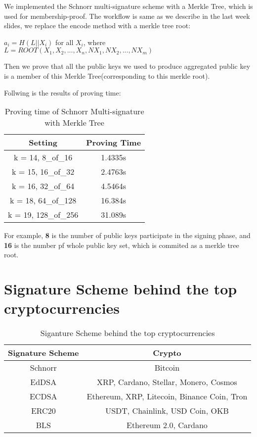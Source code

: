 \documentclass{article}
\begin{document}
We implemented the Schnorr multi-signature scheme with a Merkle Tree, which is used for membership-proof.
The workflow is same as we describe in the last week slides, we replace the encode method with a merkle tree root:

$a_i = H(L || X_i)$ for all $X_i$, where $L = ROOT(X_1, X_2, ... , X_n, NX_1, NX_2, ... , NX_m)$

Then we prove that all the public keys we used to produce aggregated public key is a member of this Merkle Tree(corresponding to this merkle root).

Follwing is the results of proving time:

\begin{table}[H]
    \centering
    \begin{tabular}{c|c} \hline
        Setting & Proving Time \\ \hline
         k = 14, 8\_of\_16& 1.4335s  \\ \hline
         k = 15, 16\_of\_32& 2.4763s \\ \hline
         k = 16, 32\_of\_64& 4.5464s \\ \hline
         k = 18, 64\_of\_128& 16.384s \\ \hline
         k = 19, 128\_of\_256& 31.089s \\ \hline
    \end{tabular}
    \caption{Proving time of Schnorr Multi-signature with Merkle Tree}
    \label{tab:my_label}
\end{table}

For example, \textbf{8} is the number of public keys participate in the signing phase, and \textbf{16} is the number pf whole public key set, which is commited as a merkle tree root.





\section{Signature Scheme behind the top cryptocurrencies}



\begin{table}[H]
    \centering
    \begin{tabular}{c|c}
        Signature Scheme & Crypto \\ \hline
        Schnorr& Bitcoin \\ \hline
        EdDSA & XRP, Cardano, Stellar, Monero, Cosmos \\ \hline
        ECDSA & Ethereum, XRP, Litecoin, Binance Coin, Tron \\ \hline
        ERC20 & USDT, Chainlink, USD Coin, OKB\\ \hline
        BLS & Ethereum 2.0, Cardano \\ \hline 
    \end{tabular}
    \caption{Siganture Scheme behind the top cryptocurrencies}
    \label{tab:my_label}
\end{table}
\end{document}
